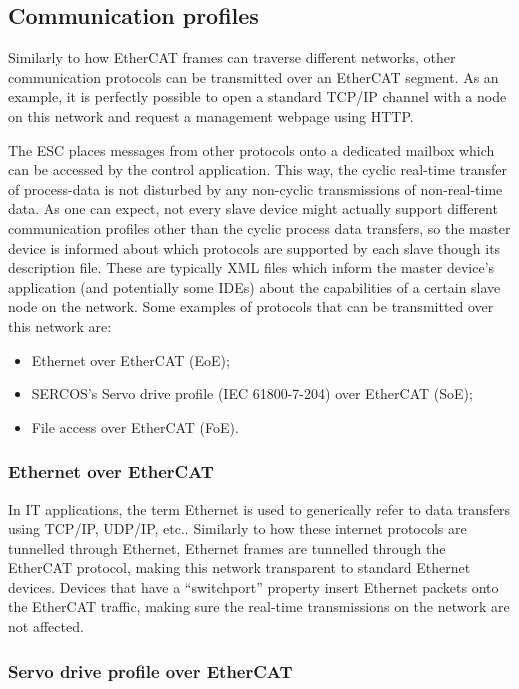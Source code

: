 \subsection{Communication profiles} \label{subsec:comm_profiles}

Similarly to how EtherCAT frames can traverse different networks, other communication protocols can be transmitted over an EtherCAT segment.
As an example, it is perfectly possible to open a standard TCP/IP channel with a node on this network and request a management webpage using HTTP.

The ESC places messages from other protocols onto a dedicated mailbox which can be accessed by the control application.
This way, the cyclic real-time transfer of process-data is not disturbed by any non-cyclic transmissions of non-real-time data.
As one can expect, not every slave device might actually support different communication profiles other than the cyclic process data transfers, so the master device is informed about which protocols are supported by each slave though its description file.
These are typically XML files which inform the master device's application (and potentially some IDEs) about the capabilities of a certain slave node on the network.
Some examples of protocols that can be transmitted over this network are:

\begin{itemize}
	\item Ethernet over EtherCAT (EoE);
	\item SERCOS's \texttrademark{} Servo drive profile (IEC 61800-7-204) over EtherCAT (SoE);
	\item File access over EtherCAT (FoE).
\end{itemize}

\subsubsection*{Ethernet over EtherCAT}

In IT applications, the term Ethernet is used to generically refer to data transfers using TCP/IP, UDP/IP, etc..
Similarly to how these internet protocols  are tunnelled through Ethernet, Ethernet frames are tunnelled through the EtherCAT protocol, making this network transparent to standard Ethernet devices.
Devices that have a ``switchport'' property insert Ethernet packets onto the EtherCAT traffic, making sure the real-time transmissions on the network are not affected.

\subsubsection*{Servo drive profile over EtherCAT}

